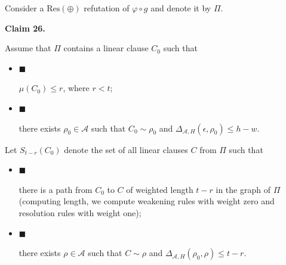 \documentclass[10pt,a4paper]{article}
\begin{document}
Consider a $\mathrm{Res}(\oplus)$ refutation of $\varphi\circ g$ and denote it by $\Pi$.\par



\par\medskip\noindent\textbf{
Claim 26. 
}\par



Assume that $\Pi$ contains a linear clause $C_{0}$ such that\par


\begin{itemize}


\item 
$\blacksquare$ 


$\mu(C_{0})\leq r$, where $r<t$;\par





\item 
$\blacksquare$ 


there exists $\rho_{0}\in\mathcal{A}$ such that $C_{0}\sim\rho_{0}$ and $\Delta_{\mathcal{A},H}(\epsilon,\rho_{0})\leq h-w$.\par





\end{itemize}


Let $S_{t-r}(C_{0})$ denote the set of all linear clauses $C$ from $\Pi$ such that\par


\begin{itemize}


\item 
$\blacksquare$ 


there is a path from $C_{0}$ to $C$ of weighted length $t-r$ in the graph of $\Pi$
(computing length, we compute weakening rules with weight zero and resolution rules with weight one);\par





\item 
$\blacksquare$ 


there exists $\rho\in\mathcal{A}$ such that $C\sim\rho$ and $\Delta_{\mathcal{A},H}(\rho_{0},\rho)\leq t-r$.\par





\end{itemize}
\end{document}
